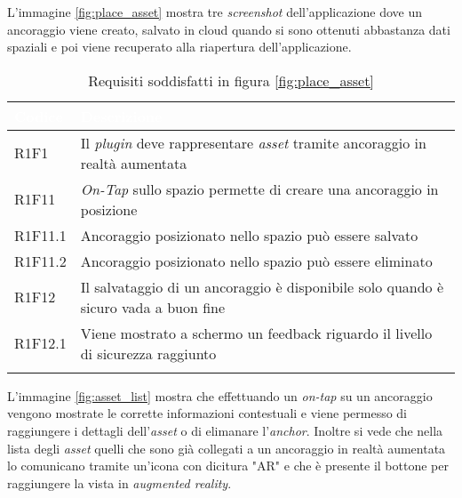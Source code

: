L'immagine \ref{fig:place_asset} mostra tre \textit{screenshot} dell'applicazione dove un ancoraggio viene creato, salvato in cloud quando si sono ottenuti abbastanza dati spaziali e poi viene recuperato alla riapertura dell'applicazione.

{
    \setlength{\freewidth}{\dimexpr\textwidth-10\tabcolsep}
    \renewcommand{\arraystretch}{1.5}
    \centering
    \setlength{\aboverulesep}{0pt}
    \setlength{\belowrulesep}{0pt}
    \begin{longtable}{C{.15\freewidth} C{.965\freewidth}}
       \toprule
    \textcolor{white}{\textbf{Codice}}&
    \textcolor{white}{\textbf{Descrizione}}\\
    \toprule
    \endhead

    R1F1 & Il \textit{plugin} deve rappresentare \textit{asset} tramite ancoraggio in realtà aumentata\\
    R1F11 & \textit{On-Tap} sullo spazio permette di creare una ancoraggio in posizione\\
    R1F11.1 & Ancoraggio posizionato nello spazio può essere salvato\\
    R1F11.2 & Ancoraggio posizionato nello spazio può essere eliminato\\
    R1F12 & Il salvataggio di un ancoraggio è disponibile solo quando è sicuro vada a buon fine\\
    R1F12.1 & Viene mostrato a schermo un feedback riguardo il livello di sicurezza raggiunto\\

    \bottomrule
    \caption{Requisiti soddisfatti in figura \ref{fig:place_asset}}
    \end{longtable}
}

L'immagine \ref{fig:asset_list} mostra che effettuando un \textit{on-tap} su un ancoraggio vengono mostrate le corrette informazioni contestuali e viene permesso di raggiungere i dettagli dell'\textit{asset} o di elimanare l'\textit{anchor}. Inoltre si vede che nella lista degli \textit{asset} quelli che sono già collegati a un ancoraggio in realtà aumentata lo comunicano tramite un'icona con dicitura "AR" e che è presente il bottone per raggiungere la vista in \textit{augmented reality}.


